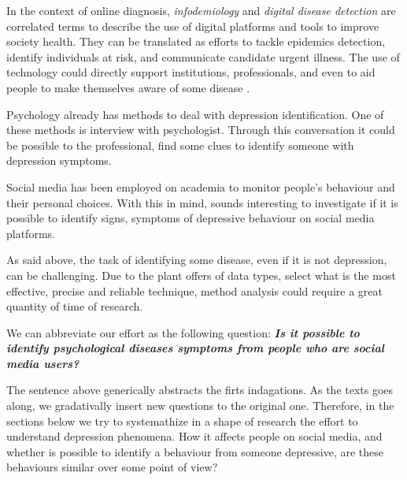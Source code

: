 \documentclass[sigconf]{acmart}
\begin{document}
In the context of online diagnosis, \textit{infodemiology} and \textit{digital disease detection} are correlated terms to describe the use of digital platforms and tools to improve society health. They can be translated as efforts to tackle epidemics detection, identify individuals at risk, and communicate candidate urgent illness. The use of technology could directly support institutions, professionals, and even to aid people to make themselves aware of some disease \cite{Horvitz}.%

Psychology already has methods to deal with depression identification. One of these methods is interview with psychologist. Through this conversation it could be possible to the professional, find some clues to identify someone with depression symptoms.


Social media has been employed on academia to monitor people's behaviour and their personal choices. With this in mind, sounds interesting to investigate if it is possible to identify signs, symptoms of depressive behaviour on social media platforms.

As said above, the task of identifying some disease, even if it is not depression, can be challenging. Due to the plant offers of data types, select what is the most effective, precise and reliable technique, method analysis could require a great quantity of time of research.

We can abbreviate our effort as the following question: \textbf{\emph{Is it possible to identify psychological diseases symptoms from people who are social media users?}}

The sentence above generically abstracts the firts indagations. As the texts goes along, we gradativally insert new questions to the original one.
Therefore, in the sections below we try to systemathize in a shape of research the effort to understand depression phenomena. How it affects people on social media, and whether is possible to identify a behaviour from someone depressive, are these behaviours similar over some point of view? 
\end{document}
